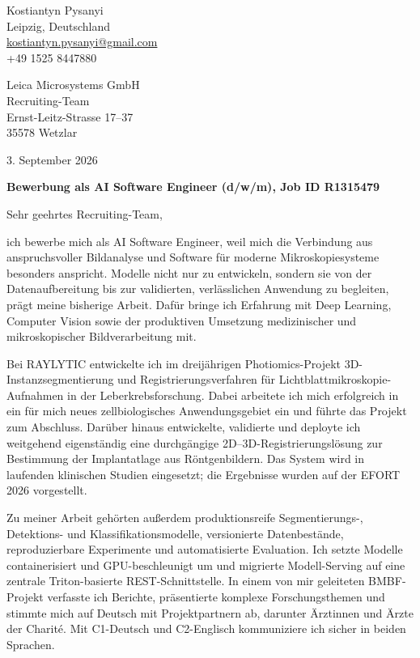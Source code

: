 \documentclass[11pt,a4paper]{article}
\begin{document}
\begin{flushright}
Kostiantyn Pysanyi\\
Leipzig, Deutschland\\
\href{mailto:kostiantyn.pysanyi@gmail.com}{kostiantyn.pysanyi@gmail.com}\\
+49 1525 8447880
\end{flushright}

Leica Microsystems GmbH\\
Recruiting-Team\\
Ernst-Leitz-Strasse 17--37\\
35578 Wetzlar

\begin{flushright}
3. September 2026
\end{flushright}

\textbf{Bewerbung als AI Software Engineer (d/w/m), Job ID R1315479}

Sehr geehrtes Recruiting-Team,

ich bewerbe mich als AI Software Engineer, weil mich die Verbindung aus anspruchsvoller Bildanalyse und Software für moderne Mikroskopiesysteme besonders anspricht. Modelle nicht nur zu entwickeln, sondern sie von der Datenaufbereitung bis zur validierten, verlässlichen Anwendung zu begleiten, prägt meine bisherige Arbeit. Dafür bringe ich Erfahrung mit Deep Learning, Computer Vision sowie der produktiven Umsetzung medizinischer und mikroskopischer Bildverarbeitung mit.

Bei RAYLYTIC entwickelte ich im dreijährigen Photiomics-Projekt 3D-Instanzsegmentierung und Registrierungsverfahren für Lichtblattmikroskopie-Aufnahmen in der Leberkrebsforschung. Dabei arbeitete ich mich erfolgreich in ein für mich neues zellbiologisches Anwendungsgebiet ein und führte das Projekt zum Abschluss. Darüber hinaus entwickelte, validierte und deployte ich weitgehend eigenständig eine durchgängige 2D--3D-Registrierungslösung zur Bestimmung der Implantatlage aus Röntgenbildern. Das System wird in laufenden klinischen Studien eingesetzt; die Ergebnisse wurden auf der EFORT 2026 vorgestellt.

Zu meiner Arbeit gehörten außerdem produktionsreife Segmentierungs-, Detektions- und Klassifikationsmodelle, versionierte Datenbestände, reproduzierbare Experimente und automatisierte Evaluation. Ich setzte Modelle containerisiert und GPU-beschleunigt um und migrierte Modell-Serving auf eine zentrale Triton-basierte REST-Schnittstelle. In einem von mir geleiteten BMBF-Projekt verfasste ich Berichte, präsentierte komplexe Forschungsthemen und stimmte mich auf Deutsch mit Projektpartnern ab, darunter Ärztinnen und Ärzte der Charité. Mit C1-Deutsch und C2-Englisch kommuniziere ich sicher in beiden Sprachen.
\end{document}
